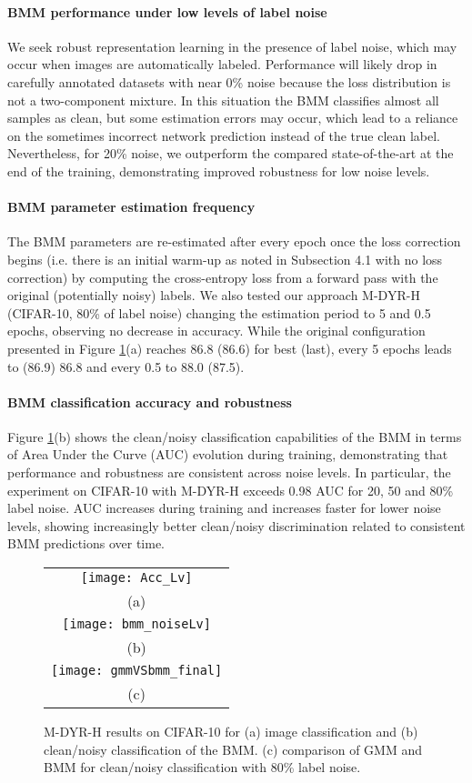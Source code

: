 \documentclass{article}
\providecommand{\tabularnewline}{\\}
\begin{document}
\paragraph{BMM performance under low levels of label noise} We seek robust representation learning in the presence of label noise,
which may occur when images are automatically labeled. Performance
will likely drop in carefully annotated datasets with near 0\% noise
because the loss distribution is not a two-component mixture. In this
situation the BMM classifies almost all samples as clean, but some
estimation errors may occur, which lead to a reliance on the sometimes
incorrect network prediction instead of the true clean label. Nevertheless,
for 20\% noise, we outperform the compared state-of-the-art at the
end of the training, demonstrating improved robustness for low noise
levels.

\paragraph{BMM parameter estimation frequency} The BMM parameters are re-estimated after every epoch once the loss
correction begins (i.e. there is an initial warm-up as noted in Subsection
4.1 with no loss correction) by computing the cross-entropy loss from
a forward pass with the original (potentially noisy) labels. We
also tested our approach M-DYR-H (CIFAR-10, 80\% of label noise) changing
the estimation period to 5 and 0.5 epochs, observing no decrease in
accuracy. While the original configuration presented in Figure \ref{fig:Proposed-approach-M-DYR-H}(a)
reaches 86.8 (86.6) for best (last), every 5 epochs leads to (86.9)
86.8 and every 0.5 to 88.0 (87.5).

\paragraph{BMM classification accuracy and robustness} Figure \ref{fig:Proposed-approach-M-DYR-H}(b) shows
the clean/noisy classification capabilities of the
BMM in terms of Area Under the Curve (AUC) evolution during training,
demonstrating that performance and robustness are consistent across
noise levels. In particular, the experiment on CIFAR-10
with M-DYR-H exceeds 0.98 AUC for 20, 50 and 80\% label noise.
AUC increases during training and increases faster
for lower noise levels, showing increasingly better clean/noisy
discrimination related to consistent BMM predictions over time. 

\begin{figure}[!t]
\centering{}\begin{tabular}{c}
\texttt{[image: Acc\_Lv]}\tabularnewline
(a)\tabularnewline
\texttt{[image: bmm\_noiseLv]}\tabularnewline
(b)\tabularnewline
\texttt{[image: gmmVSbmm\_final]}\tabularnewline
(c)\tabularnewline
\end{tabular}\caption{\label{fig:Proposed-approach-M-DYR-H}M-DYR-H results
on CIFAR-10 for (a) image classification and (b) clean/noisy classification
of the BMM. (c) comparison of GMM and BMM for clean/noisy
classification with 80\% label noise.}
\end{figure}
\end{document}
